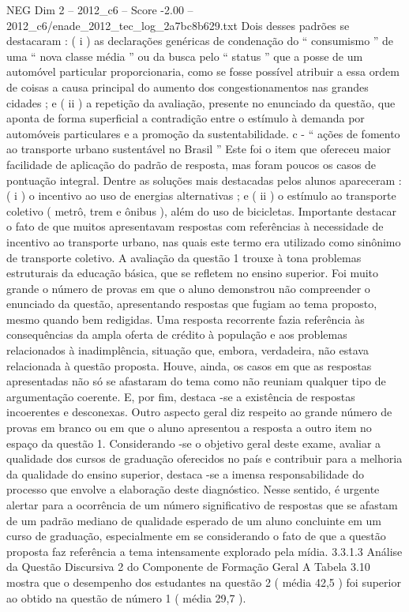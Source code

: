 \begin{textsample}{NEG Dim 2 – 2012\_c6 – Score -2.00 – 2012\_c6/enade\_2012\_tec\_log\_2a7bc8b629.txt}
Dois desses padrões se destacaram : ( i ) as declarações genéricas de condenação do “ consumismo ” de uma “ nova classe média ” ou da busca pelo “ status ” que a posse de um automóvel particular proporcionaria, como se fosse possível atribuir a essa ordem de coisas a causa principal do aumento dos congestionamentos nas grandes cidades ; e ( ii ) a repetição da avaliação, presente no enunciado da questão, que aponta de forma superficial a contradição entre o estímulo à demanda por automóveis particulares e a promoção da sustentabilidade. c - “ ações de fomento ao transporte urbano sustentável no Brasil ” Este foi o item que ofereceu maior facilidade de aplicação do padrão de resposta, mas foram poucos os casos de pontuação integral.
Dentre as soluções mais destacadas pelos alunos apareceram : ( i ) o incentivo ao uso de energias alternativas ; e ( ii ) o estímulo ao transporte coletivo ( metrô, trem e ônibus ), além do uso de bicicletas.
Importante destacar o fato de que muitos apresentavam respostas com referências à necessidade de incentivo ao transporte urbano, nas quais este termo era utilizado como sinônimo de transporte coletivo.
A avaliação da questão 1 trouxe à tona problemas estruturais da educação básica, que se refletem no ensino superior.
Foi muito grande o número de provas em que o aluno demonstrou não compreender o enunciado da questão, apresentando respostas que fugiam ao tema proposto, mesmo quando bem redigidas.
Uma resposta recorrente fazia referência às consequências da ampla oferta de crédito à população e aos problemas relacionados à inadimplência, situação que, embora, verdadeira, não estava relacionada à questão proposta.
Houve, ainda, os casos em que as respostas apresentadas não só se afastaram do tema como não reuniam qualquer tipo de argumentação coerente.
E, por fim, destaca -se a existência de respostas incoerentes e desconexas.
Outro aspecto geral diz respeito ao grande número de provas em branco ou em que o aluno apresentou a resposta a outro item no espaço da questão 1.
Considerando -se o objetivo geral deste exame, avaliar a qualidade dos cursos de graduação oferecidos no país e contribuir para a melhoria da qualidade do ensino superior, destaca -se a imensa responsabilidade do processo que envolve a elaboração deste diagnóstico.
Nesse sentido, é urgente alertar para a ocorrência de um número significativo de respostas que se afastam de um padrão mediano de qualidade esperado de um aluno concluinte em um curso de graduação, especialmente em se considerando o fato de que a questão proposta faz referência a tema intensamente explorado pela mídia. 3.3.1.3 Análise da Questão Discursiva 2 do Componente de Formação Geral A Tabela 3.10 mostra que o desempenho dos estudantes na questão 2 ( média 42,5 ) foi superior ao obtido na questão de número 1 ( média 29,7 ).

\end{textsample}
